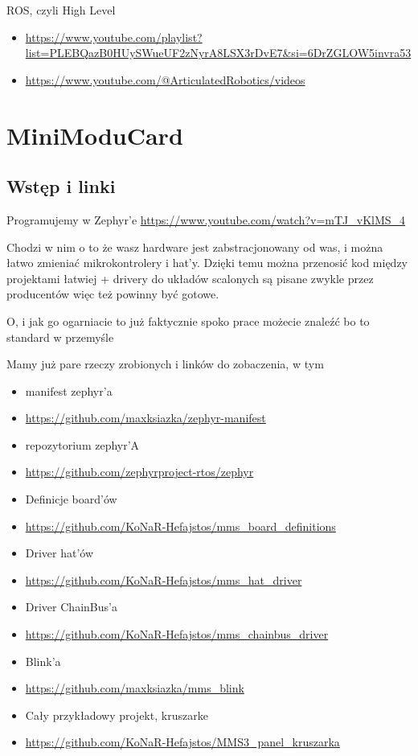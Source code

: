 \documentclass[b5paper, 10pt, twoside]{book}
\begin{document}
ROS, czyli High Level
\begin{itemize}
  \item \url{https://www.youtube.com/playlist?list=PLEBQazB0HUySWueUF2zNyrA8LSX3rDvE7&si=6DrZGLOW5invra53}
  \item \url{https://www.youtube.com/@ArticulatedRobotics/videos}
\end{itemize}

\section{MiniModuCard}
\subsection{Wstęp i linki}
Programujemy w Zephyr'e 
\url{https://www.youtube.com/watch?v=mTJ_vKlMS_4}

Chodzi w nim o to że wasz hardware jest zabstracjonowany od was, i można łatwo zmieniać mikrokontrolery i hat'y. Dzięki temu można przenosić kod między projektami łatwiej + drivery do układów scalonych są pisane zwykle przez producentów więc też powinny być gotowe.

O, i jak go ogarniacie to już faktycznie spoko prace możecie znaleźć bo to standard w przemyśle

Mamy już pare rzeczy zrobionych i linków do zobaczenia, w tym
\begin{itemize}
  \item manifest zephyr'a
  \item \url{https://github.com/maxksiazka/zephyr-manifest}
  \item repozytorium zephyr'A
  \item \url{https://github.com/zephyrproject-rtos/zephyr}
  \item  Definicje board'ów
  \item \url{https://github.com/KoNaR-Hefajstos/mms_board_definitions}
  \item Driver hat'ów
  \item \url{https://github.com/KoNaR-Hefajstos/mms_hat_driver}
  \item Driver ChainBus'a
  \item \url{https://github.com/KoNaR-Hefajstos/mms_chainbus_driver}
  \item Blink'a
  \item \url{https://github.com/maxksiazka/mms_blink}
  \item Cały przykładowy projekt, kruszarke
  \item \url{https://github.com/KoNaR-Hefajstos/MMS3_panel_kruszarka}
\end{itemize}
\end{document}
